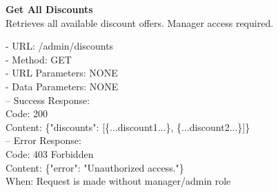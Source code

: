 \begin{flushleft}
    \textbf{Get All Discounts} \\
    Retrieves all available discount offers. Manager access required.

    - URL: /admin/discounts \\
    - Method: GET \\
    - URL Parameters: NONE \\
    - Data Parameters: NONE \\
    – Success Response: \\
    Code: 200 \\
    Content: \{"discounts": [\{...discount1...\}, \{...discount2...\}]\} \\
    – Error Response: \\
    Code: 403 Forbidden \\
    Content: \{"error": "Unauthorized access."\} \\
    When: Request is made without manager/admin role
\end{flushleft}

